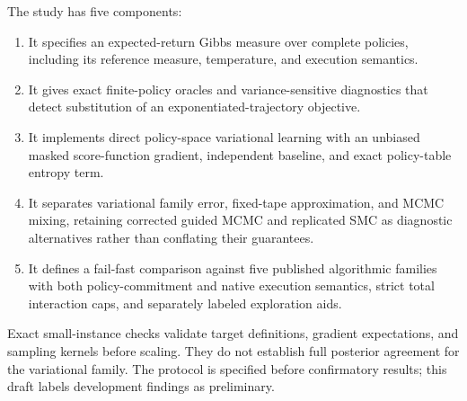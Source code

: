 The study has five components:
\begin{enumerate}
  \item It specifies an expected-return Gibbs measure over complete policies,
        including its reference measure, temperature, and execution semantics.
  \item It gives exact finite-policy oracles and variance-sensitive diagnostics
        that detect substitution of an exponentiated-trajectory objective.
  \item It implements direct policy-space variational learning with an unbiased
        masked score-function gradient, independent baseline, and exact
        policy-table entropy term.
  \item It separates variational family error, fixed-tape approximation, and
        MCMC mixing, retaining corrected guided MCMC and replicated SMC as
        diagnostic alternatives rather than conflating their guarantees.
  \item It defines a fail-fast comparison against five published algorithmic
        families with both policy-commitment and native execution semantics,
        strict total interaction caps, and separately labeled exploration aids.
\end{enumerate}

Exact small-instance checks validate target definitions, gradient expectations,
and sampling kernels before scaling. They do not establish full posterior
agreement for the variational family. The protocol is specified before
confirmatory results; this draft labels development findings as preliminary.
